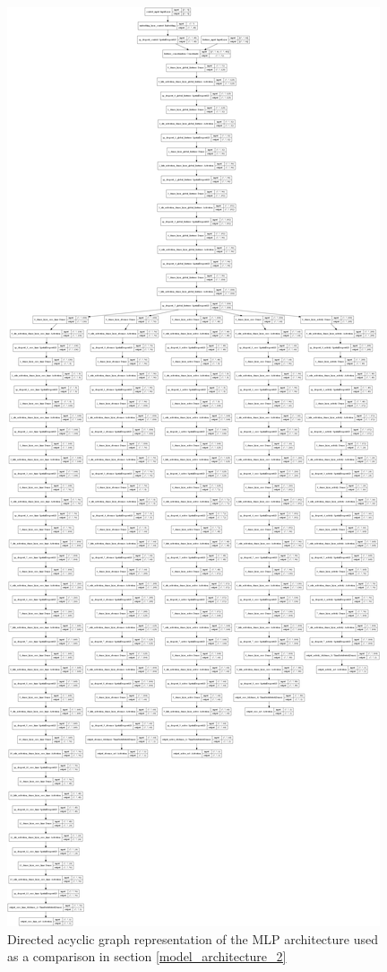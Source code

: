 \begin{figure}[H]
\centering
\includegraphics[width=\textwidth,height=0.8\textheight,keepaspectratio]{images/appendix_B/mlp_2.png}
\caption[\textbf{MLP DAG - Section \ref{model_architecture_2}}]{Directed acyclic graph representation of the MLP architecture used as a comparison in section \ref{model_architecture_2}}
\label{mlp_2_dag}
\end{figure}

